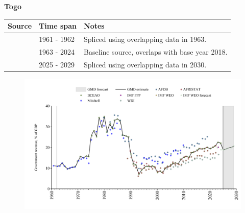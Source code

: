 \documentclass[12pt,a4paper,landscape]{article}
\begin{document}
\begin{adjustbox}{max totalsize={\paperwidth}{\paperheight},center}
\begin{minipage}[t][\textheight][t]{\textwidth}
\vspace*{0.5cm}
{}
\begin{center}
{\Large\bfseries Togo}
\end{center}
\vspace{0.5cm}
\begin{table}[H]
\centering
\small
\begin{tabular}{|l|l|l|}
\hline
\textbf{Source} & \textbf{Time span} & \textbf{Notes} \\
\hline
\rowcolor{white}\cite{Mitchell}& 1961 - 1962 &Spliced using overlapping data in 1963.\\
\rowcolor{lightgray}\cite{BCEAO}& 1963 - 2024 &Baseline source, overlaps with base year 2018.\\
\rowcolor{white}\cite{IMF_WEO_forecast}& 2025 - 2029 &Spliced using overlapping data in 2030.\\
\hline
\end{tabular}
\end{table}
\begin{figure}[H]
\centering
\includegraphics[width=\textwidth,height=0.6\textheight,keepaspectratio]{graphs/TGO_govrev_GDP.pdf}
\end{figure}
\end{minipage}
\end{adjustbox}
\end{document}
